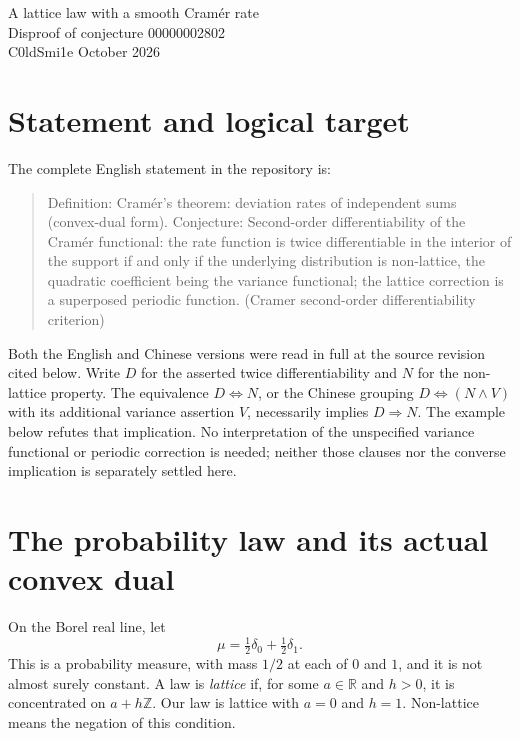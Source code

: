 \documentclass[11pt,a4paper]{article}
\newcommand{\R}{\mathbb R}
\newcommand{\Z}{\mathbb Z}
\begin{document}
\begin{center}
{\LARGE A lattice law with a smooth Cram\'er rate}\\[5pt]
{\large Disproof of conjecture 00000002802}\\[5pt]
C0ldSmi1e  October 2026
\end{center}
\vspace{-3pt}
\begin{abstract}
The fair Bernoulli probability law is a nondegenerate lattice law with every exponential moment. Its actual logarithmic moment generating function has a convex dual equal to
$\log 2+x\log x+(1-x)\log(1-x)$ for $0<x<1$, and this real representative is $C^\infty$ there. Thus interior twice differentiability does not imply a non-lattice law. We distinguish ordinary support, whose interior is empty, from convex support and the effective domain, whose interiors are both $(0,1)$. Lean verifies the necessary-implication failure for all three explicit readings.
\end{abstract}

\section{Statement and logical target}
The complete English statement in the repository is:
\begin{quote}\small
Definition: Cram\'er's theorem: deviation rates of independent sums (convex-dual form). Conjecture: Second-order differentiability of the Cram\'er functional: the rate function is twice differentiable in the interior of the support if and only if the underlying distribution is non-lattice, the quadratic coefficient being the variance functional; the lattice correction is a superposed periodic function. (Cramer second-order differentiability criterion)
\end{quote}
Both the English and Chinese versions were read in full at the source revision cited below. Write $D$ for the asserted twice differentiability and $N$ for the non-lattice property. The equivalence $D\Longleftrightarrow N$, or the Chinese grouping $D\Longleftrightarrow(N\wedge V)$ with its additional variance assertion $V$, necessarily implies $D\Longrightarrow N$. The example below refutes that implication. No interpretation of the unspecified variance functional or periodic correction is needed; neither those clauses nor the converse implication is separately settled here.

\section{The probability law and its actual convex dual}
On the Borel real line, let
\[
\mu=\tfrac12\delta_0+\tfrac12\delta_1.
\]
This is a probability measure, with mass $1/2$ at each of $0$ and $1$, and it is not almost surely constant. A law is \emph{lattice} if, for some $a\in\R$ and $h>0$, it is concentrated on $a+h\Z$. Our law is lattice with $a=0$ and $h=1$. Non-lattice means the negation of this condition.
\end{document}
